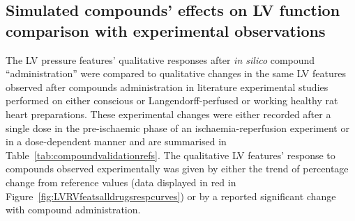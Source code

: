 \subsection{Simulated compounds' effects on LV function comparison with experimental observations}\label{sec:ch6model_simulated_compounds'_effects_on_whole-organ_function_comparison_with_experimental_observations}
The LV pressure features' qualitative responses after \textit{in silico} compound ``administration'' were compared to qualitative changes in the same LV features observed after compounds administration in literature experimental studies performed on either conscious or Langendorff-perfused or working healthy rat heart preparations. These experimental changes were either recorded after a single dose in the pre-ischaemic phase of an ischaemia-reperfusion experiment or in a dose-dependent manner and are summarised in Table~\ref{tab:compoundvalidationrefs}. The qualitative LV features' response to compounds observed experimentally was given by either the trend of percentage change from reference values (data displayed in red in Figure~\ref{fig:LVRVfeatsalldrugsrespcurves}) or by a reported significant change with compound administration. 

